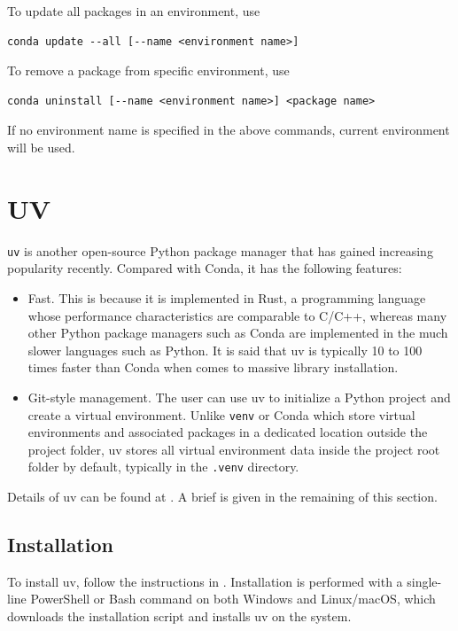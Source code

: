To update all packages in an environment, use
\begin{lstlisting}
conda update --all [--name <environment name>]
\end{lstlisting}

To remove a package from specific environment, use
\begin{lstlisting}
conda uninstall [--name <environment name>] <package name>
\end{lstlisting}

If no environment name is specified in the above commands, current environment will be used.

\section{UV}

\texttt{uv} is another open-source Python package manager that has gained increasing popularity recently. Compared with Conda, it has the following features:
\begin{itemize}
	\item Fast. This is because it is implemented in Rust, a programming language whose performance characteristics are comparable to C/C++, whereas many other Python package managers such as Conda are implemented in the much slower languages such as Python. It is said that uv is typically 10 to 100 times faster than Conda when comes to massive library installation.
	
	\item Git-style management. The user can use uv to initialize a Python project and create a virtual environment. Unlike \verb|venv| or Conda which store virtual environments and associated packages in a dedicated location outside the project folder, uv stores all virtual environment data inside the project root folder by default, typically in the \verb|.venv| directory.
\end{itemize}

Details of uv can be found at \cite{astral2025uv}. A brief is given in the remaining of this section.

\subsection{Installation}

To install uv, follow the instructions in \cite{astral2025uv}. Installation is performed with a single-line PowerShell or Bash command on both Windows and Linux/macOS, which downloads the installation script and installs uv on the system.


